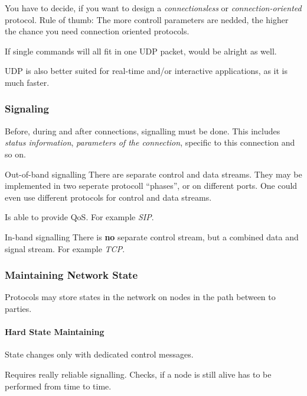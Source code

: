 \documentclass[english]{panikzettel}
\begin{document}
		You have to decide, if you want to design a \textit{connectionsless} or \textit{connection-oriented} protocol. 
	Rule of thumb: The more controll parameters are nedded, the higher the chance you need connection oriented protocols.
	
	If single commands will all fit in one UDP packet, would be alright as well.

	UDP is also better suited for real-time and/or interactive applications, as it is much faster.
	
	\subsubsection{Signaling}
	\label{sss-signaling}
	
	Before, during and after connections, signalling must be done.
	This includes \textit{status information}, \textit{parameters of the connection}, specific to this connection and so on.

	\begin{defi}{Out-of-band signalling}
		There are separate control and data streams.
		They may be implemented in two seperate protocoll \enquote{phases}, or on different ports.
		One could even use different protocols for control and data streams.

		Is able to provide QoS.
		\tcblower
		For example \textit{SIP}.
	\end{defi}

	\begin{defi}{In-band signalling}
		There is \textbf{no} separate control stream, but a combined data and signal stream.
		\tcblower
		For example \textit{TCP}.
	\end{defi}

	\subsubsection{Maintaining Network State}
	\label{sss-maintaining-network-state}
	
	Protocols may store states in the network on nodes in the path between to parties.

	\paragraph{Hard State Maintaining}
	\label{pgf-hard-state-maintaining}
	
	State changes only with dedicated control messages.

	Requires really reliable signalling.
	Checks, if a node is still alive has to be performed from time to time.
\end{document}
